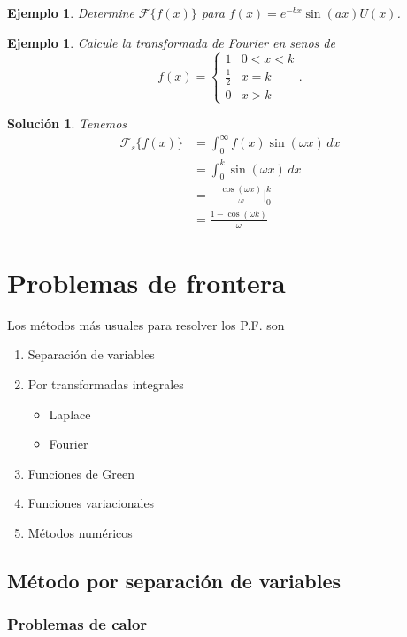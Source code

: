 \documentclass[11pt,letterpaper]{report}
\newtheorem{example}[defn]{Ejemplo}
\newtheorem*{sol}{Solución}
\newcommand\<{\langle}
\renewcommand\>{\rangle}
\let\cal\mathcal
\begin{document}
\begin{example}
  Determine $\cal F\{f(x)\}$ para $f(x)=e^{-bx}\sin(ax)U(x)$.
\end{example}

\begin{example}
  Calcule la transformada de Fourier en senos de
  \[
    f(x)=
    \begin{cases}
      1 & 0<x<k \\
      \frac{1}{2} & x=k \\
      0 & x>k
    \end{cases}
  .\]
\end{example}
\begin{sol}
  Tenemos
  \begin{align*}
    \cal F_s\{f(x)\}
    &= \int_{0}^{\infty}f(x)\sin(\omega x)\,dx \\
    &= \int_{0}^{k}\sin(\omega x)\,dx \\
    &= -\frac{\cos(\omega x)}{\omega}\Big|_{0}^{k} \\
    &= \frac{1-\cos(\omega k)}{\omega}
  \end{align*}
\end{sol}

\chapter{Problemas de frontera} %

Los métodos más usuales para resolver los P.F. son
\begin{enumerate}
  \item Separación de variables
  \item Por transformadas integrales
  \begin{itemize}
    \item   Laplace
    \item Fourier   
  \end{itemize}
  \item Funciones de Green
  \item Funciones variacionales
  \item Métodos numéricos
\end{enumerate}

\section{Método por separación de variables}

\subsection{Problemas de calor}
\end{document}
